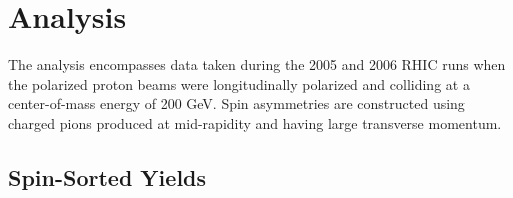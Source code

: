 \chapter{Analysis}

The analysis encompasses data taken during the 2005 and 2006 RHIC runs when
the polarized proton beams were longitudinally polarized and colliding at a
center-of-mass energy of 200 GeV. Spin asymmetries are constructed using
charged pions produced at mid-rapidity and having large transverse momentum.




\section{Spin-Sorted Yields}



